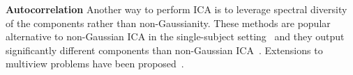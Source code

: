 \textbf{Autocorrelation} Another way to perform ICA is to leverage spectral diversity of the components rather than non-Gaussianity.
%
These methods are popular alternative to non-Gaussian ICA in the single-subject setting~\cite{tong1991indeterminacy, belouchrani1997blind, pham1997blind} and they output significantly different components than non-Gaussian ICA~\cite{delorme2012independent}.
%
Extensions to multiview problems have been proposed~\cite{lukic2002ica, congedo2010group}.
\vspace{-5pt}
%
%
%
